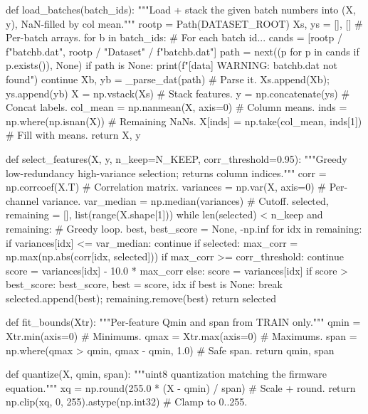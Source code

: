 def load_batches(batch_ids):
    """Load + stack the given batch numbers into (X, y), NaN-filled by col mean."""
    rootp = Path(DATASET_ROOT)
    Xs, ys = [], []                                 # Per-batch arrays.
    for b in batch_ids:                             # For each batch id...
        cands = [rootp / f"batch{b}.dat", rootp / "Dataset" / f"batch{b}.dat"]
        path = next((p for p in cands if p.exists()), None)
        if path is None:
            print(f"[data] WARNING: batch{b}.dat not found")
            continue
        Xb, yb = _parse_dat(path)                   # Parse it.
        Xs.append(Xb); ys.append(yb)
    X = np.vstack(Xs)                               # Stack features.
    y = np.concatenate(ys)                          # Concat labels.
    col_mean = np.nanmean(X, axis=0)                # Column means.
    inds = np.where(np.isnan(X))                    # Remaining NaNs.
    X[inds] = np.take(col_mean, inds[1])            # Fill with means.
    return X, y

def select_features(X, y, n_keep=N_KEEP, corr_threshold=0.95):
    """Greedy low-redundancy high-variance selection; returns column indices."""
    corr = np.corrcoef(X.T)                         # Correlation matrix.
    variances = np.var(X, axis=0)                   # Per-channel variance.
    var_median = np.median(variances)               # Cutoff.
    selected, remaining = [], list(range(X.shape[1]))
    while len(selected) < n_keep and remaining:     # Greedy loop.
        best, best_score = None, -np.inf
        for idx in remaining:
            if variances[idx] <= var_median:
                continue
            if selected:
                max_corr = np.max(np.abs(corr[idx, selected]))
                if max_corr >= corr_threshold:
                    continue
                score = variances[idx] - 10.0 * max_corr
            else:
                score = variances[idx]
            if score > best_score:
                best_score, best = score, idx
        if best is None:
            break
        selected.append(best); remaining.remove(best)
    return selected

def fit_bounds(Xtr):
    """Per-feature Qmin and span from TRAIN only."""
    qmin = Xtr.min(axis=0)                          # Minimums.
    qmax = Xtr.max(axis=0)                          # Maximums.
    span = np.where(qmax > qmin, qmax - qmin, 1.0)  # Safe span.
    return qmin, span

def quantize(X, qmin, span):
    """uint8 quantization matching the firmware equation."""
    xq = np.round(255.0 * (X - qmin) / span)        # Scale + round.
    return np.clip(xq, 0, 255).astype(np.int32)     # Clamp to 0..255.

